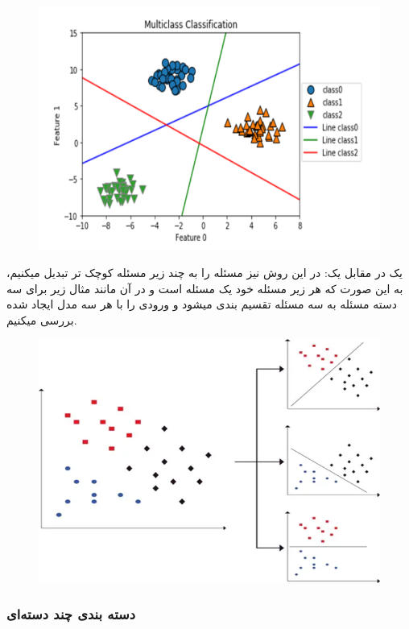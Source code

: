 \documentclass[a4paper, titlepage]{article}
\begin{document}
\begin{figure}[H]
    \center
    \includegraphics[height=8cm]{Classification-img5.png}
    \label{Classification-img5}
    \caption{}
\end{figure}

یک در مقابل یک: در این روش نیز مسئله را به چند زیر مسئله کوچک تر تبدیل میکنیم، به این صورت که هر زیر مسئله خود یک مسئله  است و در آن مانند مثال زیر برای سه دسته مسئله به سه مسئله  تقسیم بندی میشود و ورودی را با هر سه مدل ایجاد شده بررسی میکنیم.

\begin{figure}[H]
    \center
    \includegraphics[height=8cm]{Classification-img6.png}
    \label{Classification-img6}
    \caption{}
\end{figure}

\clearpage
\subsubsection{دسته‌ بندی چند دسته‌ای}
\end{document}
